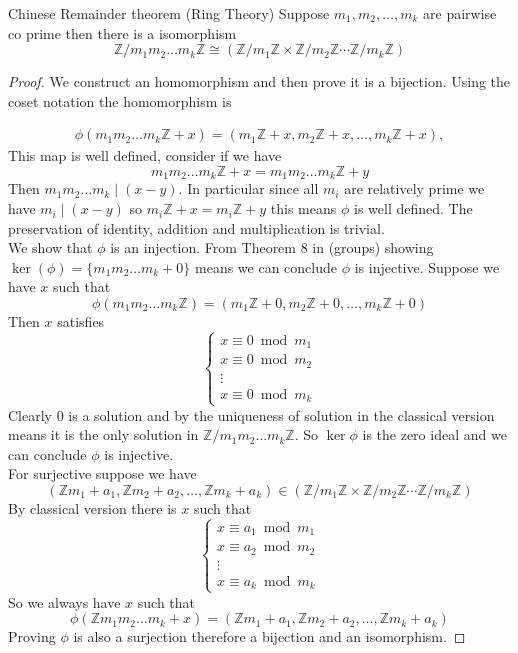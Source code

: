 \documentclass[16pt,a4paper]{article}
\theoremstyle{definition}
\newcommand{\Z}{\mathbb{Z}}
\begin{document}
\begin{thm}{Chinese Remainder theorem (Ring Theory)}{}
  Suppose $m_1,m_2,\ldots,m_k$ are pairwise co prime then there is a isomorphism 
  \[\Z/m_1m_2\ldots m_k \Z \cong  (\Z/m_1\Z \times \Z/m_2\Z \cdots \Z/m_k\Z)  \] 
\end{thm}  
\begin{proof}
We construct an homomorphism and then prove it is a bijection. Using the coset notation the homomorphism is 

\begin{align*}
\phi(m_1m_2\ldots m_k \Z + x) = \left( m_1\Z + x, m_2\Z + x, \ldots, m_k\Z +x \right),
\end{align*} 
This map is well defined, consider if we have 
\[m_1m_2\ldots m_k \Z + x = m_1m_2\ldots m_k \Z + y\]
Then $m_1m_2\ldots m_k \mid (x-y)$. In particular since all $m_i$ are relatively prime we have $m_i\mid (x-y)$ so $m_i\Z + x = m_i\Z + y$ this means $\phi$ is well defined. The preservation of identity, addition and multiplication is trivial. 
\\
We show that $\phi$ is an injection. From Theorem 8 in (groups) showing $\ker(\phi) = \{m_1m_2\ldots m_k + 0\}$ means we can conclude $\phi$ is injective. Suppose we have $x$ such that 
\[\phi(m_1m_2\ldots m_k \Z) = (m_1\Z + 0, m_2\Z + 0, \ldots, m_k\Z + 0)\]
Then $x$ satisfies 
\[
\begin{cases}
x\equiv 0 \bmod m_1 \\
x\equiv 0 \bmod m_2 \\
\vdots  \\
x\equiv 0 \bmod m_k
\end{cases}
\]
Clearly $0$ is a solution and by the uniqueness of solution in the classical version means it is the only solution in $\Z/m_1m_2\ldots m_k \Z$. So $\ker \phi$ is the zero ideal and we can conclude $\phi$ is injective.  
\\
For surjective suppose we have 
\[(\Z m_1 + a_1,\Z m_2 + a_2, \ldots , \Z m_k + a_k) \in  (\Z/m_1\Z \times \Z/m_2\Z \cdots \Z/m_k\Z) \] 
By classical version there is $x$ such that 
\[
\begin{cases}
x\equiv a_1 \bmod m_1 \\
x\equiv a_2 \bmod m_2 \\
\vdots  \\
x\equiv a_k \bmod m_k
\end{cases}
\]
So we always have $x$ such that 
\[\phi(\Z m_1m_2\ldots m_k + x) =(\Z m_1 + a_1,\Z m_2 + a_2, \ldots , \Z m_k + a_k)  \]
Proving $\phi$ is also a surjection therefore a bijection and an isomorphism. 

\end{proof}
\end{document}
